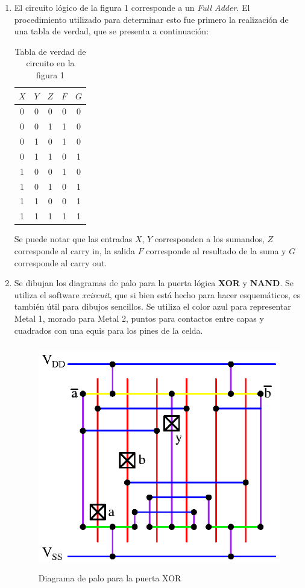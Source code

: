 \documentclass[letterpaper, 12pt]{article}
\numberwithin{equation}{section}
\begin{document}
\begin{enumerate}

  \item El circuito lógico de la figura 1 corresponde a un \emph{Full Adder}. El procedimiento utilizado para determinar esto fue primero la realización de una tabla de verdad, que se presenta a continuación:

    \begin{table}[H]
      \centering
      \begin{tabular}{ccc|cc}
        \(X\) & \(Y\) & \(Z\) & \(F\) & \(G\) \\
        \midrule
        0 & 0 & 0 & 0 & 0 \\
        0 & 0 & 1 & 1 & 0 \\
        0 & 1 & 0 & 1 & 0 \\
        0 & 1 & 1 & 0 & 1 \\
        1 & 0 & 0 & 1 & 0 \\
        1 & 0 & 1 & 0 & 1 \\
        1 & 1 & 0 & 0 & 1 \\
        1 & 1 & 1 & 1 & 1
      \end{tabular}
      \caption{Tabla de verdad de circuito en la figura 1}
    \end{table}

    Se puede notar que las entradas \(X\), \(Y\) corresponden a los sumandos, \(Z\) corresponde al carry in, la salida \(F\) corresponde al resultado  de la suma y \(G\) corresponde al carry out.

  \item Se dibujan los diagramas de palo para la puerta lógica \textbf{XOR} y \textbf{NAND}. Se utiliza el software \emph{xcircuit}, que si bien está hecho para hacer esquemáticos, es también útil para dibujos sencillos. Se utiliza el color azul para representar Metal 1, morado para Metal 2, puntos para contactos entre capas y cuadrados con una equis para los pines de la celda.

    \begin{figure}[H]
      \centering
      \includegraphics[height=280pt]{xor_stick.eps}
      \caption{Diagrama de palo para la puerta XOR}
    \end{figure}


\end{enumerate}
\end{document}
